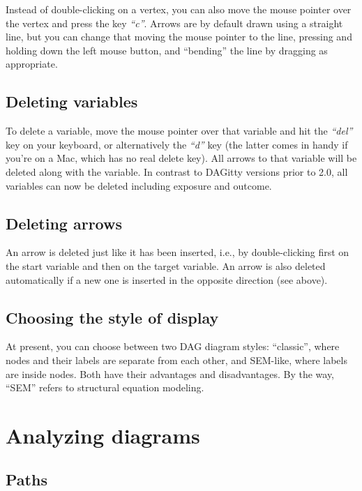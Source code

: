 \documentclass[a4paper]{article} %
\newcommand{\pp}{DAGitty\xspace}
\newcommand{\action}[1]{\emph{``#1''}}
\begin{document}
Instead of double-clicking on a vertex, you can also move the mouse pointer
over the vertex and press the key \action{c}. Arrows are by default
drawn using a straight line,
but you can change that moving the mouse pointer to the line,
pressing and holding down the left mouse button, and ``bending''
the line by dragging as appropriate.

\subsection{Deleting variables}

To delete a variable, move the mouse pointer over that variable 
and hit the \action{del} key on your keyboard, or alternatively
the \action{d} key (the latter comes in handy if you're on a Mac, which 
has no real delete key).
All arrows to that variable will be deleted along 
with the variable. In contrast to \pp versions prior to 2.0,
all variables can now be deleted including exposure and outcome.

\subsection{Deleting arrows}

An arrow is deleted just like it has been inserted, 
i.e., by double-clicking first on the start 
variable and then on the target variable. An arrow 
is also deleted automatically if a new one is 
inserted in the opposite direction (see above). 

\subsection{Choosing the style of display}

At present, you can choose between two DAG diagram styles: ``classic'', where nodes and
their labels are separate from each other, and SEM-like, where labels are inside nodes. 
Both have their advantages and disadvantages. By the way, ``SEM'' refers to structural
equation modeling.

\section{Analyzing diagrams}

\label{sec:diagramanalysis}

\subsection{Paths}
\end{document}
